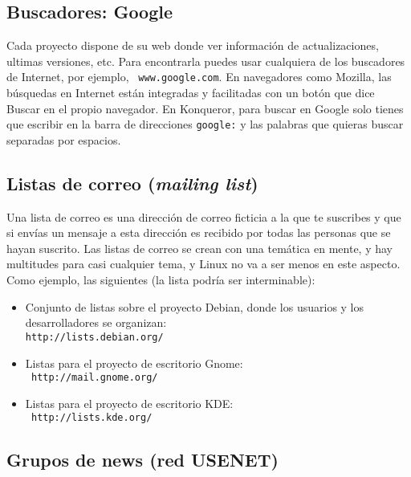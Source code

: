 \subsection{Buscadores: Google}

Cada   proyecto  dispone   de  su   web  donde   ver  información   de
actualizaciones,  ultimas  versiones,  etc.  Para  encontrarla  puedes
usar  cualquiera de  los  buscadores de  Internet,  por ejemplo,  {\tt
www.google.com}. En  navegadores como {\sf Mozilla},  las búsquedas en
Internet están integradas  y facilitadas con un botón  que dice Buscar
en el propio navegador. En {\sf Konqueror}, para buscar en Google solo
tienes que  escribir en la  barra de  direcciones {\tt google:}  y las
palabras que quieras buscar separadas por espacios.


\subsection{Listas de correo ({\em mailing list})}

Una lista de  correo es una dirección  de correo ficticia a  la que te
suscribes y que si envías un  mensaje a esta dirección es recibido por
todas las  personas que  se hayan  suscrito. Las  listas de  correo se
crean con una temática en mente,  y hay multitudes para casi cualquier
tema, y  Linux no va  a ser menos en  este aspecto. Como  ejemplo, las
siguientes (la lista podría ser interminable):

\begin{itemize}

\item Conjunto de listas sobre  el proyecto Debian, donde los usuarios
y los desarrolladores se organizan: \\ {\tt http://lists.debian.org/}

\item  Listas   para  el  proyecto   de  escritorio  Gnome:   \\  {\tt
http://mail.gnome.org/}

\item  Listas  para el  proyecto  de  escritorio  {\sf KDE}:  \\  {\tt
http://lists.kde.org/}

\end{itemize}

\subsection{Grupos de news (red USENET)}

